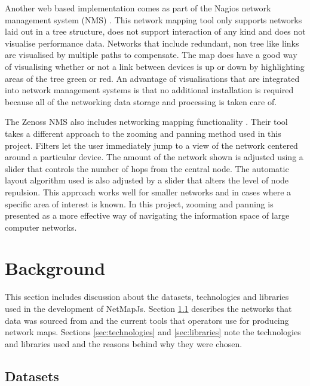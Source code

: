\documentclass[11pt, a4paper]{article}
\begin{document}
Another web based implementation comes as part of the Nagios network management
system (NMS) \cite{Nagios_website}. This network mapping tool only supports networks
laid out in a tree structure, does not support interaction of any kind and does
not visualise performance data. Networks that include redundant, non tree like
links are visualised by multiple paths to compensate. The map does have a good
way of visualising whether or not a link between devices is up or down by
highlighting areas of the tree green or red. An advantage of visualisations that
are integrated into network management systems is that no additional
installation is required because all of the networking data storage and
processing is taken care of.

The Zenoss NMS also includes networking mapping functionality
\cite{Zenoss_website}. Their tool takes a different approach to the zooming and
panning method used in this project. Filters let the user immediately jump to a
view of the network centered around a particular device. The amount of the
network shown is adjusted using a slider that controls the number of hops from
the central node. The automatic layout algorithm used is also adjusted by a
slider that alters the level of node repulsion. This approach works well for
smaller networks and in cases where a specific area of interest is known. In
this project, zooming and panning is presented as a more effective way of
navigating the information space of large computer networks.

\newpage

\section{Background}
\label{sec:background}

This section includes discussion about the datasets, technologies and libraries
used in the development of NetMapJs. Section \ref{sec:datasets} describes the
networks that data was sourced from and the current tools that operators use for
producing network maps. Sections \ref{sec:technologies} and \ref{sec:libraries}
note the technologies and libraries used and the reasons behind why they were
chosen.

\subsection{Datasets}
\label{sec:datasets}
\end{document}
